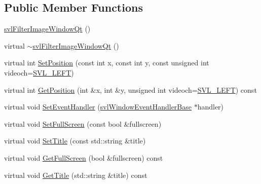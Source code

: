 \subsection*{Public Member Functions}
\begin{DoxyCompactItemize}
\item 
\hyperlink{classsvl_filter_image_window_qt_a069e1412de0bbf0c3eca6073b44ffba7}{svl\+Filter\+Image\+Window\+Qt} ()
\item 
virtual \hyperlink{classsvl_filter_image_window_qt_a47d81433ea3a2914d8c4b4391804bc96}{$\sim$svl\+Filter\+Image\+Window\+Qt} ()
\item 
virtual int \hyperlink{classsvl_filter_image_window_qt_aceef81c3d0aa4a60d74f8c2adada578c}{Set\+Position} (const int x, const int y, const unsigned int videoch=\hyperlink{svl_definitions_8h_ab9fec7615f19c8df2919eebcab0b187f}{S\+V\+L\+\_\+\+L\+E\+F\+T})
\item 
virtual int \hyperlink{classsvl_filter_image_window_qt_a0a213d43130ea046e79827c361265b73}{Get\+Position} (int \&x, int \&y, unsigned int videoch=\hyperlink{svl_definitions_8h_ab9fec7615f19c8df2919eebcab0b187f}{S\+V\+L\+\_\+\+L\+E\+F\+T}) const 
\item 
virtual void \hyperlink{classsvl_filter_image_window_qt_ac84cea44f3b44300b847e3d0bc0c2b61}{Set\+Event\+Handler} (\hyperlink{classsvl_window_event_handler_base}{svl\+Window\+Event\+Handler\+Base} $\ast$handler)
\item 
virtual void \hyperlink{classsvl_filter_image_window_qt_aca21e3caa482db351cbbbca30db8d462}{Set\+Full\+Screen} (const bool \&fullscreen)
\item 
virtual void \hyperlink{classsvl_filter_image_window_qt_aeb13a1dd3c075aa238ddd7208c0e6977}{Set\+Title} (const std\+::string \&title)
\item 
virtual void \hyperlink{classsvl_filter_image_window_qt_a74ae46705a4c9a624daa6db879199fb4}{Get\+Full\+Screen} (bool \&fullscreen) const 
\item 
virtual void \hyperlink{classsvl_filter_image_window_qt_aba1adaf57009c70684dfd0e1a63baabf}{Get\+Title} (std\+::string \&title) const 
\end{DoxyCompactItemize}
